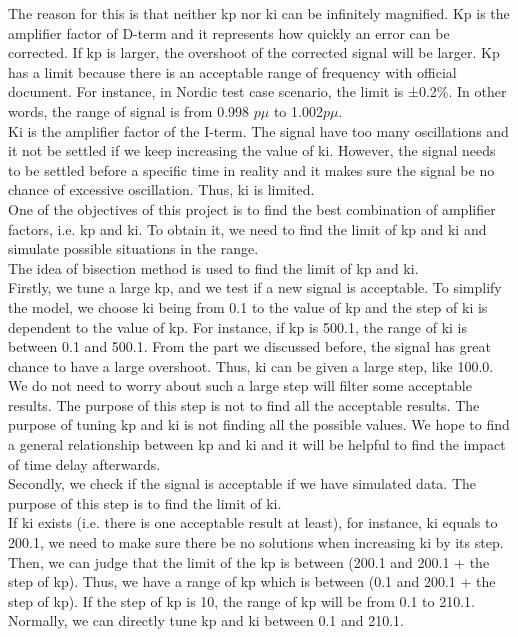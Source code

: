 \documentclass{report}
\begin{document}
The reason for this is that neither kp nor ki can be infinitely magnified. Kp is the amplifier factor of D-term and it represents how quickly an error can be corrected. If kp is larger, the overshoot of the corrected signal will be larger. Kp has a limit because there is an acceptable range of frequency with official document. For instance, in Nordic test case scenario, the limit is ±0.2\%. In other words, the range of signal is from 0.998 $p\mu$ to 1.002$p\mu$.\\

Ki is the amplifier factor of the I-term. The signal have too many oscillations and it not be settled if we keep increasing the value of ki. 
However, the signal needs to be settled before a specific time in reality and it makes sure the signal be no chance of excessive oscillation. Thus, ki is limited.\\

One of the objectives of this project is to find the best combination of amplifier factors, i.e. kp and ki. To obtain it, we need to find the limit of kp and ki and simulate possible situations in the range.\\

The idea of bisection method is used to find the limit of kp and ki.\\

Firstly, we tune a large kp, and we test if a new signal is acceptable. To simplify the model, we choose ki being from 0.1 to the value of kp and the step of ki is dependent to the value of kp. For instance, if kp is 500.1, the range of ki is between 0.1 and 500.1. From the part we discussed before, the signal has great chance to have a large overshoot. Thus, ki can be given a large step, like 100.0. We do not need to worry about such a large step will filter some acceptable results. The purpose of this step is not to find all the acceptable results. The purpose of tuning kp and ki is not finding all the possible values. We hope to find a general relationship between kp and ki and it will be helpful to find the impact of time delay afterwards.\\

Secondly, we check if the signal is acceptable if we have simulated data. The purpose of this step is to find the limit of ki.\\

If ki exists (i.e. there is one acceptable result at least), for instance, ki equals to 200.1, we need to make sure there be no solutions when increasing ki by its step. Then, we can judge that the limit of the kp is between (200.1 and 200.1 + the step of kp). Thus, we have a range of kp which is between (0.1 and 200.1 + the step of kp). If the step of kp is 10, the range of kp will be from 0.1 to 210.1. Normally, we can directly tune kp and ki between 0.1 and 210.1.\\
\end{document}
